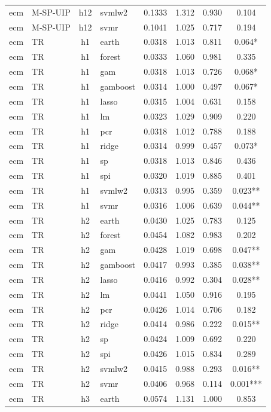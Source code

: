 \begin{ThreePartTable}
\begin{longtable}[t]{llclcccc}
ecm & M-SP-UIP & h12 & svmlw2 & 0.1333 & 1.312 & 0.930 & 0.104\\
ecm & M-SP-UIP & h12 & svmr & 0.1041 & 1.025 & 0.717 & 0.194\\
\addlinespace
ecm & TR & h1 & earth & 0.0318 & 1.013 & 0.811 & 0.064*\\
ecm & TR & h1 & forest & 0.0333 & 1.060 & 0.981 & 0.335\\
ecm & TR & h1 & gam & 0.0318 & 1.013 & 0.726 & 0.068*\\
ecm & TR & h1 & gamboost & 0.0314 & 1.000 & 0.497 & 0.067*\\
ecm & TR & h1 & lasso & 0.0315 & 1.004 & 0.631 & 0.158\\
ecm & TR & h1 & lm & 0.0323 & 1.029 & 0.909 & 0.220\\
ecm & TR & h1 & pcr & 0.0318 & 1.012 & 0.788 & 0.188\\
ecm & TR & h1 & ridge & 0.0314 & 0.999 & 0.457 & 0.073*\\
ecm & TR & h1 & sp & 0.0318 & 1.013 & 0.846 & 0.436\\
ecm & TR & h1 & spi & 0.0320 & 1.019 & 0.885 & 0.401\\
ecm & TR & h1 & svmlw2 & 0.0313 & 0.995 & 0.359 & 0.023**\\
ecm & TR & h1 & svmr & 0.0316 & 1.006 & 0.639 & 0.044**\\
\addlinespace
ecm & TR & h2 & earth & 0.0430 & 1.025 & 0.783 & 0.125\\
ecm & TR & h2 & forest & 0.0454 & 1.082 & 0.983 & 0.202\\
ecm & TR & h2 & gam & 0.0428 & 1.019 & 0.698 & 0.047**\\
ecm & TR & h2 & gamboost & 0.0417 & 0.993 & 0.385 & 0.038**\\
ecm & TR & h2 & lasso & 0.0416 & 0.992 & 0.304 & 0.028**\\
ecm & TR & h2 & lm & 0.0441 & 1.050 & 0.916 & 0.195\\
ecm & TR & h2 & pcr & 0.0426 & 1.014 & 0.706 & 0.182\\
ecm & TR & h2 & ridge & 0.0414 & 0.986 & 0.222 & 0.015**\\
ecm & TR & h2 & sp & 0.0424 & 1.009 & 0.692 & 0.220\\
ecm & TR & h2 & spi & 0.0426 & 1.015 & 0.834 & 0.289\\
ecm & TR & h2 & svmlw2 & 0.0415 & 0.988 & 0.293 & 0.016**\\
ecm & TR & h2 & svmr & 0.0406 & 0.968 & 0.114 & 0.001***\\
\addlinespace
ecm & TR & h3 & earth & 0.0574 & 1.131 & 1.000 & 0.853\\

\end{longtable}
\end{ThreePartTable}
